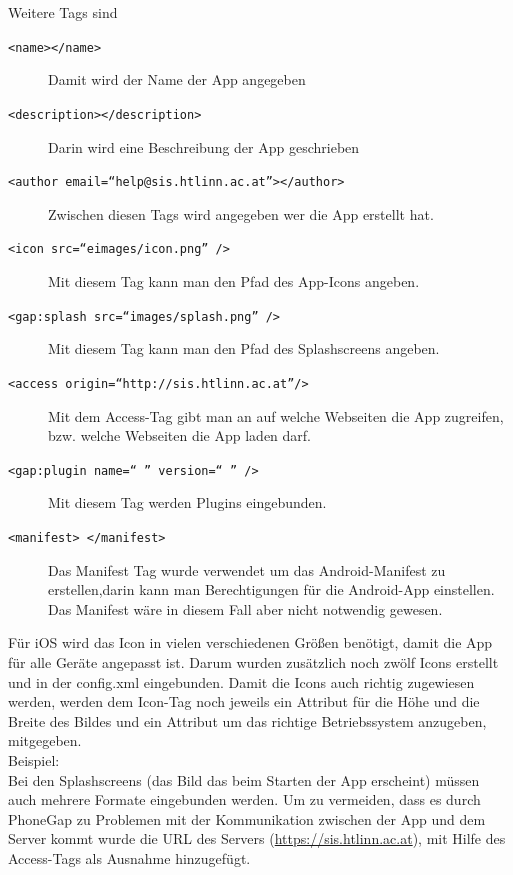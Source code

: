 


Weitere Tags sind\\
\begin{description}
\item[\texttt{<name></name>}] Damit wird der Name der App angegeben
\item[\texttt{<description></description>}] Darin wird eine Beschreibung der App geschrieben
\item[\texttt{<author email=\enquote{help@sis.htlinn.ac.at}></author>}] Zwischen diesen Tags wird angegeben wer die App erstellt hat.
\item[\texttt{<icon src=\enquote{eimages/icon.png} />}] Mit diesem Tag kann man den Pfad des App-Icons angeben.
\item[\texttt{<gap:splash src=\enquote{images/splash.png} />}] Mit diesem Tag kann man den Pfad des Splashscreens angeben.
\item[\texttt{<access origin=\enquote{http://sis.htlinn.ac.at}/>}]Mit dem Access-Tag gibt man an auf welche Webseiten die App zugreifen, bzw. welche Webseiten die App laden darf.
\item[\texttt{<gap:plugin name=\enquote{ } version=\enquote{ } />}] Mit diesem Tag werden Plugins eingebunden.
\item[\texttt{<manifest> </manifest>}] Das Manifest Tag wurde verwendet um das Android-Manifest zu erstellen,darin kann man	Berechtigungen für die Android-App einstellen. Das Manifest wäre in diesem Fall aber nicht notwendig gewesen.
\end{description}

Für iOS wird das Icon in vielen verschiedenen Größen benötigt, damit die App für alle Geräte angepasst ist. Darum wurden zusätzlich noch zwölf Icons erstellt und in der config.xml eingebunden. Damit die Icons auch richtig zugewiesen werden, werden dem Icon-Tag noch jeweils ein Attribut für die Höhe und die Breite des Bildes und ein Attribut um das richtige Betriebssystem anzugeben, mitgegeben.\\
Beispiel:\\


	

Bei den Splashscreens (das Bild das beim Starten der App erscheint) müssen auch mehrere Formate eingebunden werden.
Um zu vermeiden, dass es durch PhoneGap zu Problemen mit der Kommunikation zwischen der App und dem Server kommt wurde die URL des Servers (\href{https://sis.htlinn.ac.at}{https://sis.htlinn.ac.at}), mit Hilfe des Access-Tags als Ausnahme hinzugefügt.\\

